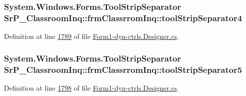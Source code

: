 \hypertarget{class_sr_p___classroom_inq_1_1frm_classrrom_inq_a4b694b6ce3670642d724af5e79c46031}{
\subsubsection[{tool\-Strip\-Separator4}]{\setlength{\rightskip}{0pt plus 5cm}\-System.\-Windows.\-Forms.\-Tool\-Strip\-Separator {\bf \-Sr\-P\-\_\-\-Classroom\-Inq\-::frm\-Classrrom\-Inq\-::tool\-Strip\-Separator4}}}
\label{class_sr_p___classroom_inq_1_1frm_classrrom_inq_a4b694b6ce3670642d724af5e79c46031}


\-Definition at line \hyperlink{_form1-dyn-ctrls_8_designer_8cs_source_l01789}{1789} of file \hyperlink{_form1-dyn-ctrls_8_designer_8cs_source}{\-Form1-\/dyn-\/ctrls.\-Designer.\-cs}.

\hypertarget{class_sr_p___classroom_inq_1_1frm_classrrom_inq_ae8424b2612bda51525d313c05df65bb0}{
\subsubsection[{tool\-Strip\-Separator5}]{\setlength{\rightskip}{0pt plus 5cm}\-System.\-Windows.\-Forms.\-Tool\-Strip\-Separator {\bf \-Sr\-P\-\_\-\-Classroom\-Inq\-::frm\-Classrrom\-Inq\-::tool\-Strip\-Separator5}}}
\label{class_sr_p___classroom_inq_1_1frm_classrrom_inq_ae8424b2612bda51525d313c05df65bb0}


\-Definition at line \hyperlink{_form1-dyn-ctrls_8_designer_8cs_source_l01798}{1798} of file \hyperlink{_form1-dyn-ctrls_8_designer_8cs_source}{\-Form1-\/dyn-\/ctrls.\-Designer.\-cs}.

